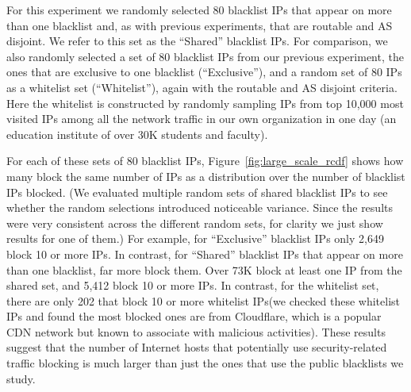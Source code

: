For this experiment we randomly selected 80 blacklist IPs that appear
on more than one blacklist and, as with previous experiments, that are
routable and AS disjoint.  We refer to this set as the ``Shared''
blacklist IPs.  For comparison, we also randomly selected a set of 80
blacklist IPs from our previous experiment, the ones that are
exclusive to one blacklist (``Exclusive''), and a random set of 80 IPs
as a whitelist set (``Whitelist''), again with the routable and AS disjoint
criteria. Here the whitelist is constructed by randomly sampling IPs
from top 10,000 most visited IPs among all the network traffic in our own
organization in one day (an education institute of over 30K students
and faculty).



For each of these sets of 80 blacklist IPs,
Figure~\ref{fig:large_scale_rcdf} shows how many {} block
the same number of IPs as a distribution over the number of blacklist
IPs blocked.  (We evaluated multiple random sets of shared blacklist
IPs to see whether the random selections introduced noticeable
variance.  Since the results were very consistent across the different
random sets, for clarity we just show results for one of them.)  For
example, for ``Exclusive'' blacklist IPs only 2,649 {}
block 10 or more IPs.  In contrast, for ``Shared'' blacklist IPs that
appear on more than one blacklist, far more {} block them.
Over 73K {} block at least one IP from the shared set, and
5,412 {} block 10 or more IPs.  In contrast, for the
whitelist set, there are only 202 {} that block 10 or more
whitelist IPs(we checked these whitelist IPs and found the most blocked
ones are from Cloudflare, which is a popular CDN network but
known to associate with malicious activities).
These results suggest that the number of Internet
hosts that potentially use security-related traffic blocking is much
larger than just the ones that use the public blacklists we study.


